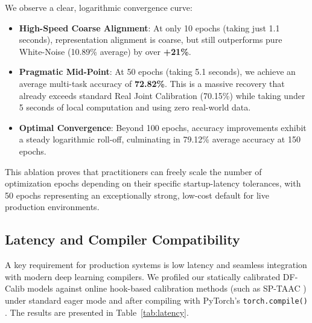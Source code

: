 \documentclass{article}
\theoremstyle{plain}
\theoremstyle{definition}
\theoremstyle{remark}
\begin{document}
We observe a clear, logarithmic convergence curve:
\begin{itemize}
  \item \textbf{High-Speed Coarse Alignment}: At only 10 epochs (taking just 1.1 seconds), representation alignment is coarse, but still outperforms pure White-Noise (10.89\% average) by over \textbf{+21\%}.
  \item \textbf{Pragmatic Mid-Point}: At 50 epochs (taking 5.1 seconds), we achieve an average multi-task accuracy of \textbf{72.82\%}. This is a massive recovery that already exceeds standard Real Joint Calibration (70.15\%) while taking under 5 seconds of local computation and using zero real-world data.
  \item \textbf{Optimal Convergence}: Beyond 100 epochs, accuracy improvements exhibit a steady logarithmic roll-off, culminating in 79.12\% average accuracy at 150 epochs.
\end{itemize}
This ablation proves that practitioners can freely scale the number of optimization epochs depending on their specific startup-latency tolerances, with 50 epochs representing an exceptionally strong, low-cost default for live production environments.

\subsection{Latency and Compiler Compatibility}
A key requirement for production systems is low latency and seamless integration with modern deep learning compilers. We profiled our statically calibrated DF-Calib models against online hook-based calibration methods (such as SP-TAAC \cite{sptaac2026}) under standard eager mode and after compiling with PyTorch's \texttt{torch.compile()} \cite{Ansel2024}. The results are presented in Table~\ref{tab:latency}.

\begin{table}[h]
\caption{Inference Latency (ms per batch of 64) and Compiler Compatibility on H100 GPU.}
\label{tab:latency}
\vskip 0.15in
\begin{center}
\begin{small}
\end{small}
\end{center}
\vskip -0.1in
\end{table}
\end{document}
